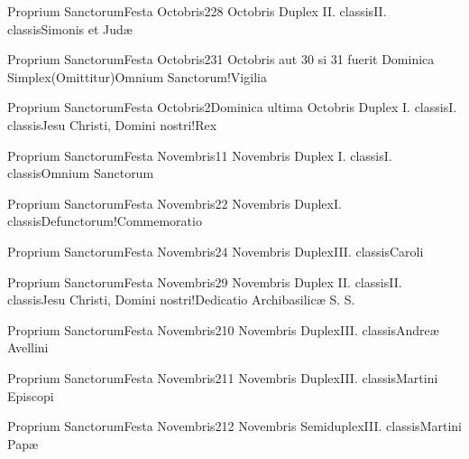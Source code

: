 \documentclass[invitatoriale-romanum.tex]{subfiles}
\begin{document}
	{Proprium Sanctorum}{Festa Octobris}{2}{28 Octobris}
	{Duplex II. classis}{II. classis}{Simonis et Judæ}
	{}
	{}

	{Proprium Sanctorum}{Festa Octobris}{2}{31 Octobris aut 30 si 31 fuerit Dominica}
	{Simplex}{(Omittitur)}{Omnium Sanctorum!Vigilia}
	{}
	{}
\invitferia

	{Proprium Sanctorum}{Festa Octobris}{2}{Dominica ultima Octobris}
	{Duplex I. classis}{I. classis}{Jesu Christi, Domini nostri!Rex}
	{}
	{}


	{Proprium Sanctorum}{Festa Novembris}{1}{1 Novembris}
	{Duplex I. classis}{I. classis}{Omnium Sanctorum}
	{}
	{}

	{Proprium Sanctorum}{Festa Novembris}{2}{2 Novembris}
	{Duplex}{I. classis}{Defunctorum!Commemoratio}
	{}
	{}

	{Proprium Sanctorum}{Festa Novembris}{2}{4 Novembris}
	{Duplex}{III. classis}{Caroli}
	{}
	{}

	{Proprium Sanctorum}{Festa Novembris}{2}{9 Novembris}
	{Duplex II. classis}{II. classis}{Jesu Christi, Domini nostri!Dedicatio Archibasilicæ S. S.\linebreak\null}
	{}
	{}

	{Proprium Sanctorum}{Festa Novembris}{2}{10 Novembris}
	{Duplex}{III. classis}{Andreæ Avellini}
	{}
	{}

	{Proprium Sanctorum}{Festa Novembris}{2}{11 Novembris}
	{Duplex}{III. classis}{Martini Episcopi}
	{}
	{}

	{Proprium Sanctorum}{Festa Novembris}{2}{12 Novembris}
	{Semiduplex}{III. classis}{Martini Papæ}
	{}
	{}
\end{document}
